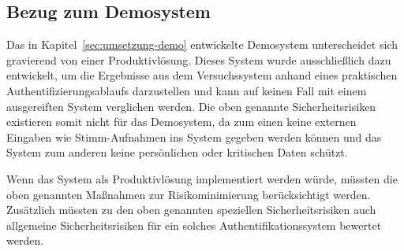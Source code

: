 
\subsection{Bezug zum Demosystem}

\textauthor{\vJB,}{\vLB}{}

Das in Kapitel~\ref{sec:umsetzung-demo} entwickelte Demosystem unterscheidet sich gravierend von einer Produktivlösung.
Dieses System wurde ausschließlich dazu entwickelt, um die Ergebnisse aus dem Versuchssystem anhand eines praktischen Authentifizierungsablaufs darzustellen und kann auf keinen Fall mit einem ausgereiften System verglichen werden.
Die oben genannte Sicherheitsrisiken existieren somit nicht für das Demosystem, da zum einen keine externen Eingaben wie Stimm-Aufnahmen ins System gegeben werden können und das System zum anderen keine persönlichen oder kritischen Daten schützt.

Wenn das System als Produktivlösung implementiert werden würde, müssten die oben genannten Maßnahmen zur Risikominimierung berücksichtigt werden.
Zusätzlich müssten zu den oben genannten speziellen Sicherheitsrisiken auch allgemeine Sicherheitsrisiken für ein solches Authentifikationssystem bewertet werden.